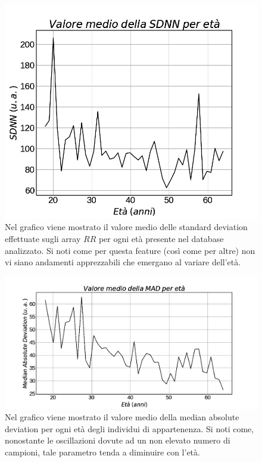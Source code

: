 \documentclass[a4paper, 12pt]{book}
\begin{document}
\begin{figure}[h!]
	\centering
	\includegraphics[width=\textwidth]{SDNN-age.jpg}
	\caption{Nel grafico viene mostrato il valore medio delle standard deviation 				effettuate sugli array $RR$ per ogni età presente nel database analizzato.
	Si noti come per questa feature (così come per altre) non vi siano andamenti 				apprezzabili che emergano al variare dell'età.}
	\label{fig:SDNN-age}
\end{figure}

\begin{figure}[h!]
	\centering
	\includegraphics[width=\textwidth]{MAD-age.jpg}
	\caption{Nel grafico viene mostrato il valore medio della median absolute deviation 	per ogni età degli individui di appartenenza.
	Si noti come, nonostante le oscillazioni dovute ad un non elevato numero di 				campioni, tale parametro tenda a diminuire con l'età.}
	\label{fig:MAD-age}
\end{figure}
\end{document}
